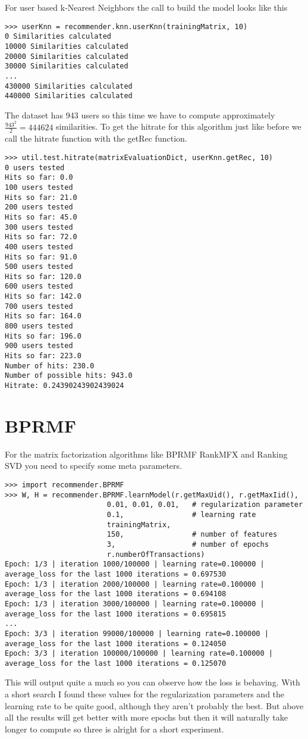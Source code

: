 For user based k-Nearest Neighbors the call to build the model looks like this
\begin{lstlisting}
>>> userKnn = recommender.knn.userKnn(trainingMatrix, 10)
0 Similarities calculated
10000 Similarities calculated
20000 Similarities calculated
30000 Similarities calculated
...
430000 Similarities calculated
440000 Similarities calculated
\end{lstlisting}
The dataset has 943 users so this time we have to compute approximately
\begin{math} \frac{943^2}{2} = 444624 \end{math} similarities.
To get the hitrate for this algorithm just like before we call the hitrate
function with the getRec function.
\begin{lstlisting}
>>> util.test.hitrate(matrixEvaluationDict, userKnn.getRec, 10)
0 users tested
Hits so far: 0.0
100 users tested
Hits so far: 21.0
200 users tested
Hits so far: 45.0
300 users tested
Hits so far: 72.0
400 users tested
Hits so far: 91.0
500 users tested
Hits so far: 120.0
600 users tested
Hits so far: 142.0
700 users tested
Hits so far: 164.0
800 users tested
Hits so far: 196.0
900 users tested
Hits so far: 223.0
Number of hits: 230.0
Number of possible hits: 943.0
Hitrate: 0.24390243902439024
\end{lstlisting}

\section{BPRMF}
For the matrix factorization algorithms like BPRMF RankMFX
and Ranking SVD you need to specify some meta parameters.
\begin{lstlisting}
>>> import recommender.BPRMF
>>> W, H = recommender.BPRMF.learnModel(r.getMaxUid(), r.getMaxIid(),
                        0.01, 0.01, 0.01,   # regularization parameter
                        0.1,                # learning rate
                        trainingMatrix,
                        150,                # number of features
                        3,                  # number of epochs
                        r.numberOfTransactions)
Epoch: 1/3 | iteration 1000/100000 | learning rate=0.100000 | average_loss for the last 1000 iterations = 0.697530
Epoch: 1/3 | iteration 2000/100000 | learning rate=0.100000 | average_loss for the last 1000 iterations = 0.694108
Epoch: 1/3 | iteration 3000/100000 | learning rate=0.100000 | average_loss for the last 1000 iterations = 0.695815
...
Epoch: 3/3 | iteration 99000/100000 | learning rate=0.100000 | average_loss for the last 1000 iterations = 0.124050
Epoch: 3/3 | iteration 100000/100000 | learning rate=0.100000 | average_loss for the last 1000 iterations = 0.125070
\end{lstlisting}
This will output quite a much so you can observe how the loss is behaving.
With a short search I found these values for the regularization parameters
and the learning rate to be quite good, although they aren't probably the
best. But above all the results will get better with more epochs but then
it will naturally take longer to compute so three is alright for a short
experiment.

